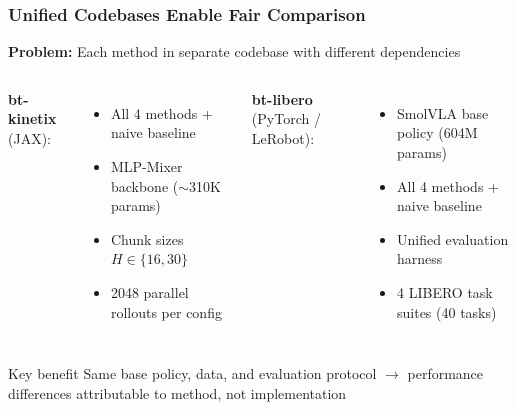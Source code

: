 \documentclass[aspectratio=1610]{beamer}
\begin{document}
\begin{frame}
\frametitle{Unified Codebases Enable Fair Comparison}

\textbf{Problem:} Each method in separate codebase with different dependencies

\vspace{0.5em}
\begin{columns}
\textbf{bt-kinetix} (JAX):
\begin{itemize}
    \item All 4 methods + naive baseline
    \item MLP-Mixer backbone ($\sim$310K params)
    \item Chunk sizes $H \in \{16, 30\}$
    \item 2048 parallel rollouts per config
\end{itemize}

\textbf{bt-libero} (PyTorch / LeRobot):
\begin{itemize}
    \item SmolVLA base policy (604M params)
    \item All 4 methods + naive baseline
    \item Unified evaluation harness
    \item 4 LIBERO task suites (40 tasks)
\end{itemize}
\end{columns}

\vspace{0.5em}
\begin{block}{Key benefit}
Same base policy, data, and evaluation protocol $\rightarrow$ performance differences attributable to method, not implementation
\end{block}

\end{frame}
\end{document}
